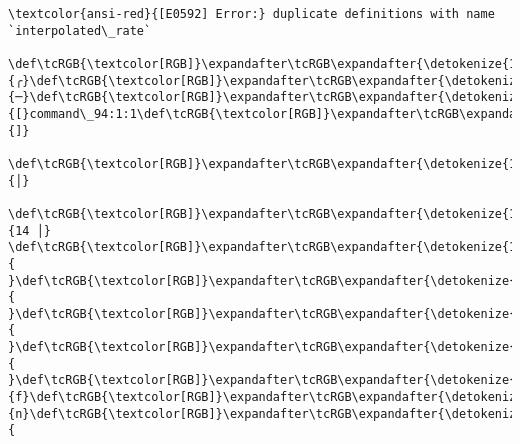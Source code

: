 \documentclass[11pt]{article}
\begin{document}
    \begin{Verbatim}[commandchars=\\\{\}, frame=single, framerule=2mm, rulecolor=\color{outerrorbackground}]
\textcolor{ansi-red}{[E0592] Error:} duplicate definitions with name `interpolated\_rate`
    \def\tcRGB{\textcolor[RGB]}\expandafter\tcRGB\expandafter{\detokenize{148,148,148}}{╭}\def\tcRGB{\textcolor[RGB]}\expandafter\tcRGB\expandafter{\detokenize{148,148,148}}{─}\def\tcRGB{\textcolor[RGB]}\expandafter\tcRGB\expandafter{\detokenize{148,148,148}}{[}command\_94:1:1\def\tcRGB{\textcolor[RGB]}\expandafter\tcRGB\expandafter{\detokenize{148,148,148}}{]}
    \def\tcRGB{\textcolor[RGB]}\expandafter\tcRGB\expandafter{\detokenize{148,148,148}}{│}
 \def\tcRGB{\textcolor[RGB]}\expandafter\tcRGB\expandafter{\detokenize{148,148,148}}{14 │} \def\tcRGB{\textcolor[RGB]}\expandafter\tcRGB\expandafter{\detokenize{178,178,178}}{ }\def\tcRGB{\textcolor[RGB]}\expandafter\tcRGB\expandafter{\detokenize{178,178,178}}{ }\def\tcRGB{\textcolor[RGB]}\expandafter\tcRGB\expandafter{\detokenize{178,178,178}}{ }\def\tcRGB{\textcolor[RGB]}\expandafter\tcRGB\expandafter{\detokenize{178,178,178}}{ }\def\tcRGB{\textcolor[RGB]}\expandafter\tcRGB\expandafter{\detokenize{95,0,135}}{f}\def\tcRGB{\textcolor[RGB]}\expandafter\tcRGB\expandafter{\detokenize{95,0,135}}{n}\def\tcRGB{\textcolor[RGB]}\expandafter\tcRGB\expandafter{\detokenize{95,0,135}}{ 
\end{Verbatim}
\end{document}
